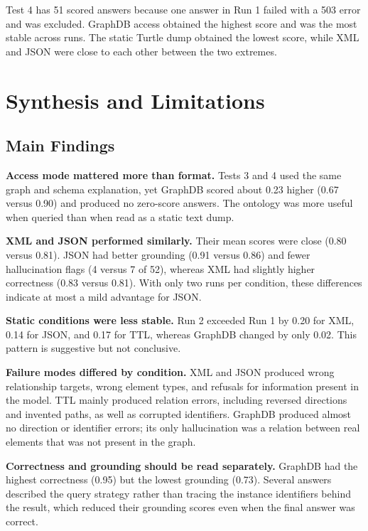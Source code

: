Test 4 has 51 scored answers because one answer in Run 1 failed with a 503 error and was excluded. GraphDB access obtained the highest score and was the most stable across runs. The static Turtle dump obtained the lowest score, while XML and JSON were close to each other between the two extremes.

\section{Synthesis and Limitations}
\label{sec:ai-synthesis}

\subsection{Main Findings}
\label{subsec:ai-findings}

\textbf{Access mode mattered more than format.} Tests 3 and 4 used the same graph and schema explanation, yet GraphDB scored about 0.23 higher (0.67 versus 0.90) and produced no zero-score answers. The ontology was more useful when queried than when read as a static text dump.

\textbf{XML and JSON performed similarly.} Their mean scores were close (0.80 versus 0.81). JSON had better grounding (0.91 versus 0.86) and fewer hallucination flags (4 versus 7 of 52), whereas XML had slightly higher correctness (0.83 versus 0.81). With only two runs per condition, these differences indicate at most a mild advantage for JSON.

\textbf{Static conditions were less stable.} Run 2 exceeded Run 1 by 0.20 for XML, 0.14 for JSON, and 0.17 for TTL, whereas GraphDB changed by only 0.02. This pattern is suggestive but not conclusive.

\textbf{Failure modes differed by condition.} XML and JSON produced wrong relationship targets, wrong element types, and refusals for information present in the model. TTL mainly produced relation errors, including reversed directions and invented paths, as well as corrupted identifiers. GraphDB produced almost no direction or identifier errors; its only hallucination was a relation between real elements that was not present in the graph.

\textbf{Correctness and grounding should be read separately.} GraphDB had the highest correctness (0.95) but the lowest grounding (0.73). Several answers described the query strategy rather than tracing the instance identifiers behind the result, which reduced their grounding scores even when the final answer was correct.

